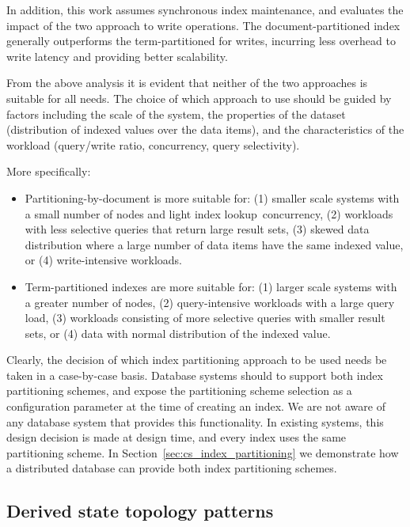 In addition, this work assumes synchronous index maintenance, and evaluates the impact of the two approach to write
operations.
The document-partitioned index generally outperforms the term-partitioned for writes,
incurring less overhead to write latency and providing better scalability.

From the above analysis it is evident that neither of the two approaches is suitable for all needs.
The choice of which approach to use should be guided by factors including the scale of the system,
the properties of the dataset (distribution of indexed values over the data items),
and the characteristics of the workload (query/write ratio, concurrency, query selectivity).

More specifically:
\begin{itemize}

  \item Partitioning-by-document is more suitable for:
  (1) smaller scale systems with a small number of nodes and light index lookup concurrency,
  (2) workloads with less selective queries that return large result sets,
  (3) skewed data distribution where a large number of data items have the same indexed value,
  or (4) write-intensive workloads.

  \item Term-partitioned indexes are more suitable for:
  (1) larger scale systems with a greater number of nodes,
  (2) query-intensive workloads with a large query load,
  (3) workloads consisting of more selective queries with smaller result sets,
  or (4) data with normal distribution of the indexed value.

\end{itemize}

Clearly, the decision of which index partitioning approach to be used needs be taken in a case-by-case basis.
Database systems should to support both index partitioning schemes, and expose the partitioning scheme selection as a
configuration parameter at the time of creating an index.
We are not aware of any database system that provides this functionality.
In existing systems, this design decision is made at design time, and every index uses the same partitioning scheme.
\cite{kejriwal:slik, tan:diffindex, riakv:secondaryindexes, cassandra:secondaryindexing}
In Section~\ref{sec:cs_index_partitioning} we demonstrate how a distributed database can provide both index partitioning
schemes.


\subsection{Derived state topology patterns}
\label{sec:topology_patterns}

